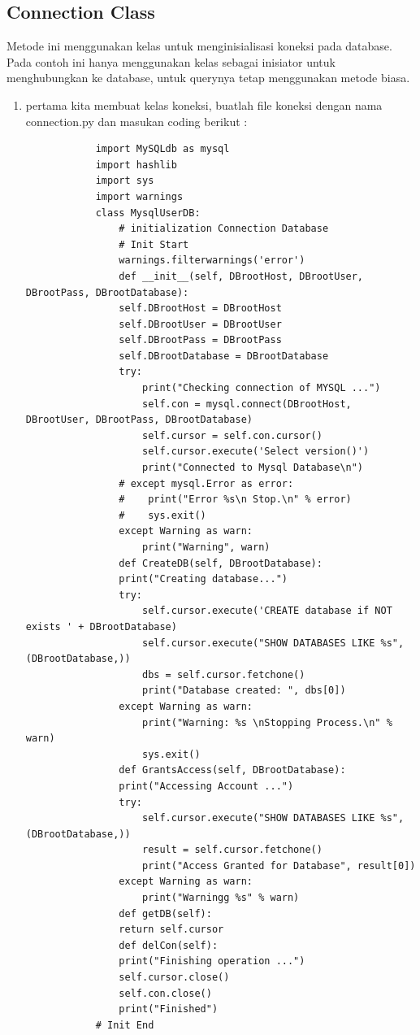 \subsection {Connection Class}
	Metode ini menggunakan kelas untuk menginisialisasi koneksi pada database. Pada contoh ini hanya menggunakan kelas sebagai inisiator untuk menghubungkan ke database, untuk querynya tetap menggunakan metode biasa.
	\begin{enumerate}
		\item pertama kita membuat kelas koneksi, buatlah file koneksi dengan nama connection.py dan masukan coding berikut :
			\begin{verbatim}
			import MySQLdb as mysql
			import hashlib
			import sys
			import warnings
			class MysqlUserDB:
    			# initialization Connection Database
    			# Init Start
    			warnings.filterwarnings('error')
    			def __init__(self, DBrootHost, DBrootUser, DBrootPass, DBrootDatabase):
        		self.DBrootHost = DBrootHost
        		self.DBrootUser = DBrootUser
        		self.DBrootPass = DBrootPass
        		self.DBrootDatabase = DBrootDatabase
        		try:
            		print("Checking connection of MYSQL ...")
            		self.con = mysql.connect(DBrootHost, DBrootUser, DBrootPass, DBrootDatabase)
            		self.cursor = self.con.cursor()
            		self.cursor.execute('Select version()')
            		print("Connected to Mysql Database\n")
        		# except mysql.Error as error:
        		#    print("Error %s\n Stop.\n" % error)
        		#    sys.exit()
        		except Warning as warn:
            		print("Warning", warn)
    			def CreateDB(self, DBrootDatabase):
        		print("Creating database...")
        		try:
            		self.cursor.execute('CREATE database if NOT exists ' + DBrootDatabase)
            		self.cursor.execute("SHOW DATABASES LIKE %s", (DBrootDatabase,))
            		dbs = self.cursor.fetchone()
            		print("Database created: ", dbs[0])
        		except Warning as warn:
            		print("Warning: %s \nStopping Process.\n" % warn)
            		sys.exit()
    			def GrantsAccess(self, DBrootDatabase):
        		print("Accessing Account ...")
        		try:
            		self.cursor.execute("SHOW DATABASES LIKE %s", (DBrootDatabase,))
            		result = self.cursor.fetchone()
            		print("Access Granted for Database", result[0])
        		except Warning as warn:
            		print("Warningg %s" % warn)
    			def getDB(self):
        		return self.cursor
    			def delCon(self):
        		print("Finishing operation ...")
        		self.cursor.close()
        		self.con.close()
        		print("Finished")
			# Init End
		\end{verbatim}


\end{enumerate}
